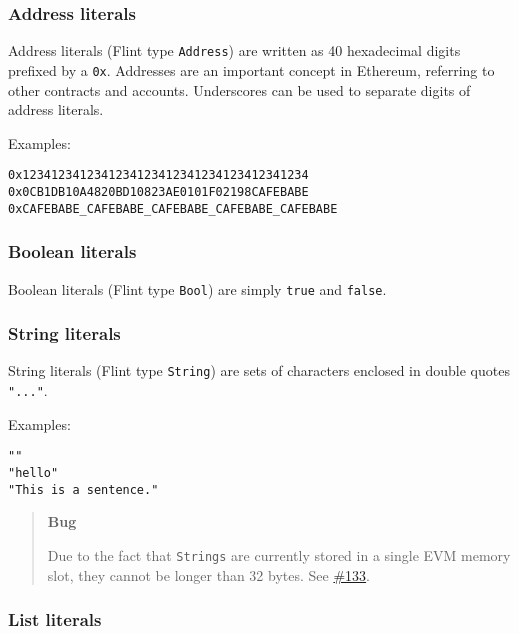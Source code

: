 \subsubsection{Address literals}
\label{sec:appendix-b-address-literals}

Address literals (Flint type \texttt{Address}) are written as 40 hexadecimal digits prefixed by a \texttt{0x}. Addresses are an important concept in Ethereum, referring to other contracts and accounts. Underscores can be used to separate digits of address literals.

Examples:

\begin{verbatim}
0x1234123412341234123412341234123412341234
0x0CB1DB10A4820BD10823AE0101F02198CAFEBABE
0xCAFEBABE_CAFEBABE_CAFEBABE_CAFEBABE_CAFEBABE
\end{verbatim}

\subsubsection{Boolean literals}
\label{sec:appendix-b-boolean-literals}

Boolean literals (Flint type \texttt{Bool}) are simply \texttt{true} and \texttt{false}.

\subsubsection{String literals}
\label{sec:appendix-b-string-literals}

String literals (Flint type \texttt{String}) are sets of characters enclosed in double quotes \texttt{"..."}.

Examples:

\begin{verbatim}
""
"hello"
"This is a sentence."
\end{verbatim}

\begin{quote}
\textbf{Bug}

Due to the fact that \texttt{Strings} are currently stored in a single EVM memory slot, they cannot be longer than 32 bytes. See \href{https://github.com/flintrocks/flint/issues/133}{\#133}.
\end{quote}

\subsubsection{List literals}
\label{sec:appendix-b-list-literals}

